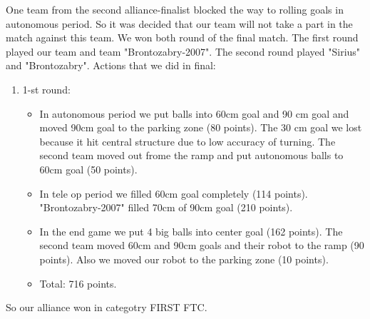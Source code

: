 One team from the second alliance-finalist blocked the way to rolling goals in autonomous period. So it was decided that our team will not take a part in the match against this team. We won both round of the final match. The first round played our team and team "Brontozabry-2007". The second round played "Sirius" and "Brontozabry".\newline
Actions that we did in final:
\begin{enumerate}
	\item 1-st round:
	\begin{itemize}
		\item In autonomous period we put balls into 60cm goal and 90 cm goal and moved 90cm goal to the parking zone (80 points). The 30 cm goal we lost because it hit central structure due to low accuracy of turning. The second team moved out frome the ramp and put autonomous balls to 60cm goal (50 points).
		
		\item In tele op period we filled 60cm goal completely (114 points). "Brontozabry-2007" filled 70cm of 90cm goal (210 points).
		
		\item In the end game we put 4 big balls into center goal (162 points). The second team moved 60cm and 90cm goals and their robot to the ramp (90 points). Also we moved our robot to the parking zone (10 points).
		
		\item Total: 716 points.
	\end{itemize}
\end{enumerate}


So our alliance won in categotry FIRST FTC.\newline

